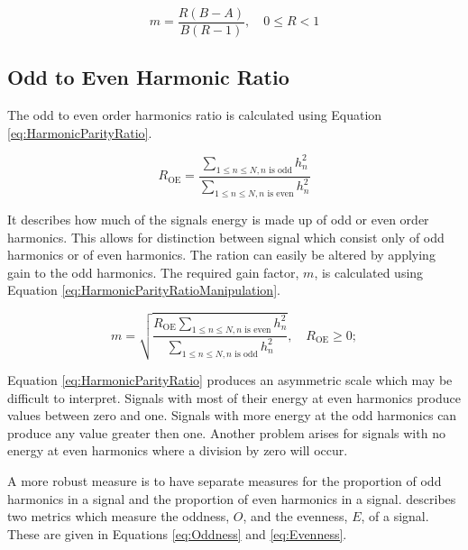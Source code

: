 		\begin{equation}
			m = \frac{R(B - A)}{B(R - 1)}, \quad 0 \leq R < 1
			\label{eq:GeneralTristimulusManipulation}
		\end{equation}

	\subsection{Odd to Even Harmonic Ratio}
	\label{sec:FetureControl-Parameterisation-HarmonicParityRatio}
		The odd to even order harmonics ratio is calculated using Equation \ref{eq:HarmonicParityRatio}.
		
		\begin{equation}
			R_{\textrm{OE}} = \frac{\sum_{1 \leq n \leq N, n \textrm{ is odd}} h_{n}^{2}}
			              {\sum_{1 \leq n \leq N, n \textrm{ is even}} h_{n}^{2}}
			\label{eq:HarmonicParityRatio}
		\end{equation}

		It describes how much of the signals energy is made up of odd or even order harmonics. This allows for
		distinction between signal which consist only of odd harmonics or of even harmonics. The ration can easily
		be altered by applying gain to the odd harmonics. The required gain factor, $m$, is calculated using
		Equation \ref{eq:HarmonicParityRatioManipulation}.

		\begin{equation}
			m = \sqrt{\frac{R_{\textrm{OE}}\sum_{1 \leq n \leq N, n \textrm{ is even}} h_{n}^{2}}
			               {\sum_{1 \leq n \leq N, n \textrm{ is odd}} h_{n}^{2}}},
				       \quad R_{\textrm{OE}} \geq 0;
		       \label{eq:HarmonixParityRatioManipulation}
		\end{equation}

		Equation \ref{eq:HarmonicParityRatio} produces an asymmetric scale which may be difficult to interpret.
		Signals with most of their energy at even harmonics produce values between zero and one. Signals with more
		energy at the odd harmonics can produce any value greater then one. Another problem arises for signals with
		no energy at even harmonics where a division by zero will occur.

		A more robust measure is to have separate measures for the proportion of odd harmonics in a signal and the
		proportion of even harmonics in a signal.  \citet{lukasik2005towards} describes two metrics which measure
		the oddness, $O$, and the evenness, $E$, of a signal. These are given in Equations \ref{eq:Oddness} and
		\ref{eq:Evenness}.

